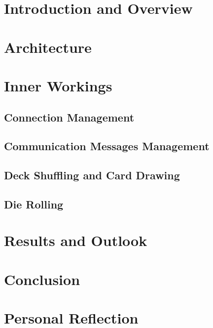 










\printglossaries

\chapter{Introduction and Overview}





\chapter{Architecture}
\chapter{Inner Workings}
\section{Connection Management}
\section{Communication Messages Management}
\section{Deck Shuffling and Card Drawing}
\section{Die Rolling}
\chapter{Results and Outlook}
\chapter{Conclusion}


\appendix
\chapter{Personal Reflection}




